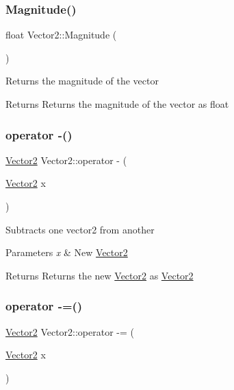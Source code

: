 \subsubsection{\texorpdfstring{Magnitude()}{Magnitude()}}
{\footnotesize\ttfamily float Vector2\+::\+Magnitude (\begin{DoxyParamCaption}{ }\end{DoxyParamCaption})\hspace{0.3cm}{\ttfamily [inline]}}

Returns the magnitude of the vector \begin{DoxyReturn}{Returns}
Returns the magnitude of the vector as float 
\end{DoxyReturn}
\mbox{\label{struct_vector2_accce68ad818627dbe189c9e946aa1c80}} 
\subsubsection{\texorpdfstring{operator -\/()}{operator -()}}
{\footnotesize\ttfamily \mbox{\hyperlink{struct_vector2}{Vector2}} Vector2\+::operator -\/ (\begin{DoxyParamCaption}\item[{\mbox{\hyperlink{struct_vector2}{Vector2}}}]{x }\end{DoxyParamCaption})\hspace{0.3cm}{\ttfamily [inline]}}

Subtracts one vector2 from another 
\begin{DoxyParams}{Parameters}
{\em x} & New \mbox{\hyperlink{struct_vector2}{Vector2}} \\
\hline
\end{DoxyParams}
\begin{DoxyReturn}{Returns}
Returns the new \mbox{\hyperlink{struct_vector2}{Vector2}} as \mbox{\hyperlink{struct_vector2}{Vector2}} 
\end{DoxyReturn}
\mbox{\label{struct_vector2_affe953e6b1098456324e4fdea72ec8e4}} 
\subsubsection{\texorpdfstring{operator -\/=()}{operator -=()}}
{\footnotesize\ttfamily \mbox{\hyperlink{struct_vector2}{Vector2}} Vector2\+::operator -\/= (\begin{DoxyParamCaption}\item[{\mbox{\hyperlink{struct_vector2}{Vector2}}}]{x }\end{DoxyParamCaption})\hspace{0.3cm}{\ttfamily [inline]}}


